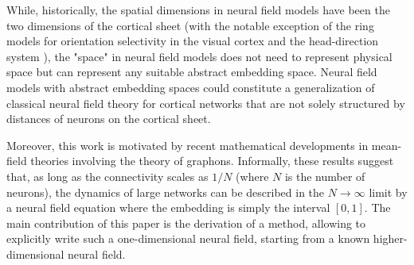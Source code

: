 \documentclass[10pt,letterpaper]{article}
\begin{document}
While, historically, the spatial dimensions in neural field models have been the two dimensions of the cortical sheet (with the notable exception of the ring models for orientation selectivity in the visual cortex \cite{BenBar95} and the head-direction system \cite{Zha96}), the "space" in neural field models does not need to represent physical space but can represent any suitable abstract embedding space. Neural field models with abstract embedding spaces could constitute a generalization of classical neural field theory for cortical networks that are not solely structured by distances of neurons on the cortical sheet.

Moreover, this work is motivated by recent mathematical developments \cite{JabPoy21} in mean-field theories involving the theory of graphons. Informally, these results suggest that, as long as the connectivity scales as $1/N$ (where $N$ is the number of neurons), the dynamics of large networks can be described in the $N \to \infty$ limit by a neural field equation where the embedding is simply the interval $[0,1]$. The main contribution of this paper is the derivation of a method, allowing to explicitly write such a one-dimensional neural field, starting from a known higher-dimensional neural field.




\end{document}
